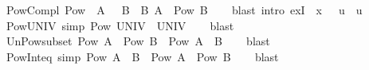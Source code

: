 \begin{isabellebody}
\endisatagproof
{\isafoldproof}%
%
\isadelimproof
\isanewline
%
\endisadelimproof
\isanewline
{}\isamarkupfalse%
\ Pow{\isacharunderscore}{\kern0pt}Compl{\isacharcolon}{\kern0pt}\ {\isachardoublequoteopen}Pow\ {\isacharparenleft}{\kern0pt}{\isacharminus}{\kern0pt}\ A{\isacharparenright}{\kern0pt}\ {\isacharequal}{\kern0pt}\ {\isacharbraceleft}{\kern0pt}{\isacharminus}{\kern0pt}\ B\ {\isacharbar}{\kern0pt}\ B{\isachardot}{\kern0pt}\ A\ {\isasymin}\ Pow\ B{\isacharbraceright}{\kern0pt}{\isachardoublequoteclose}\isanewline
%
\isadelimproof
\ \ %
\endisadelimproof
%
\isatagproof
{}\isamarkupfalse%
\ {\isacharparenleft}{\kern0pt}blast\ intro{\isacharcolon}{\kern0pt}\ exI\ {\isacharbrackleft}{\kern0pt}\ {\isacharquery}{\kern0pt}x\ {\isacharequal}{\kern0pt}\ {\isachardoublequoteopen}{\isacharminus}{\kern0pt}\ u{\isachardoublequoteclose}\ \ u{\isacharbrackright}{\kern0pt}{\isacharparenright}{\kern0pt}%
\endisatagproof
{\isafoldproof}%
%
\isadelimproof
\isanewline
%
\endisadelimproof
\isanewline
{}\isamarkupfalse%
\ Pow{\isacharunderscore}{\kern0pt}UNIV\ {\isacharbrackleft}{\kern0pt}simp{\isacharbrackright}{\kern0pt}{\isacharcolon}{\kern0pt}\ {\isachardoublequoteopen}Pow\ UNIV\ {\isacharequal}{\kern0pt}\ UNIV{\isachardoublequoteclose}\isanewline
%
\isadelimproof
\ \ %
\endisadelimproof
%
\isatagproof
{}\isamarkupfalse%
\ blast%
\endisatagproof
{\isafoldproof}%
%
\isadelimproof
\isanewline
%
\endisadelimproof
\isanewline
{}\isamarkupfalse%
\ Un{\isacharunderscore}{\kern0pt}Pow{\isacharunderscore}{\kern0pt}subset{\isacharcolon}{\kern0pt}\ {\isachardoublequoteopen}Pow\ A\ {\isasymunion}\ Pow\ B\ {\isasymsubseteq}\ Pow\ {\isacharparenleft}{\kern0pt}A\ {\isasymunion}\ B{\isacharparenright}{\kern0pt}{\isachardoublequoteclose}\isanewline
%
\isadelimproof
\ \ %
\endisadelimproof
%
\isatagproof
{}\isamarkupfalse%
\ blast%
\endisatagproof
{\isafoldproof}%
%
\isadelimproof
\isanewline
%
\endisadelimproof
\isanewline
{}\isamarkupfalse%
\ Pow{\isacharunderscore}{\kern0pt}Int{\isacharunderscore}{\kern0pt}eq\ {\isacharbrackleft}{\kern0pt}simp{\isacharbrackright}{\kern0pt}{\isacharcolon}{\kern0pt}\ {\isachardoublequoteopen}Pow\ {\isacharparenleft}{\kern0pt}A\ {\isasyminter}\ B{\isacharparenright}{\kern0pt}\ {\isacharequal}{\kern0pt}\ Pow\ A\ {\isasyminter}\ Pow\ B{\isachardoublequoteclose}\isanewline
%
\isadelimproof
\ \ %
\endisadelimproof
%
\isatagproof
{}\isamarkupfalse%
\ blast%
\endisatagproof
{\isafoldproof}%
%
\isadelimproof

\end{isabellebody}
